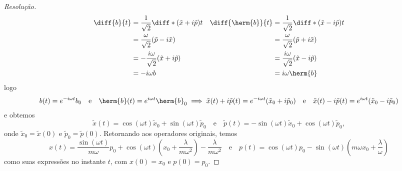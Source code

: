 \begin{proof}[Resolução]
\begin{align*}
        \diff{b}{t} &= \frac{1}{\sqrt{2}}\diff*{(\tilde{x} + i\tilde{p})}{t}&
        \diff{\herm{b}}{t} &= \frac{1}{\sqrt{2}}\diff*{(\tilde{x} - i\tilde{p})}{t}\\
                           &= \frac{\omega}{\sqrt{2}}(\tilde{p} - i \tilde{x})&
                           &= \frac{\omega}{\sqrt{2}}(\tilde{p} + i \tilde{x})\\
                           &= -\frac{i \omega}{\sqrt{2}}(\tilde{x} + i \tilde{p})&
                           &= \frac{i\omega}{\sqrt{2}}(\tilde{x} - i \tilde{p})\\
                           &= -i \omega b&
                           &= i \omega \herm{b}
    \end{align*}
    logo
    \begin{equation*}
        b(t) = e^{-i \omega t} b_0 \quad\text{e}\quad \herm{b}(t) = e^{i \omega t} \herm{b}_0 \implies \tilde{x}(t) + i \tilde{p}(t) = e^{-i \omega t} (\tilde{x}_0 + i \tilde{p}_0) \quad\text{e}\quad \tilde{x}(t) - i \tilde{p}(t) = e^{i \omega t} (\tilde{x}_0 - i \tilde{p}_0) 
    \end{equation*}
    e obtemos
    \begin{equation*}
        \tilde{x}(t) = \cos(\omega t) \tilde{x}_0 + \sin(\omega t) \tilde{p}_0
        \quad\text{e}\quad
        \tilde{p}(t) = - \sin(\omega t) \tilde{x}_0 + \cos(\omega t) \tilde{p}_0,
    \end{equation*}
    onde \(\tilde{x}_0 = \tilde{x}(0)\) e \(\tilde{p}_0 = \tilde{p}(0).\)
    Retornando aos operadores originais, temos
    \begin{equation*}
        x(t) = \frac{\sin(\omega t)}{m \omega} p_0+ \cos(\omega t) \left(x_0 + \frac{\lambda}{m \omega^2}\right) - \frac{\lambda}{m \omega^2}
        \quad\text{e}\quad
        p(t) = \cos(\omega t) p_0 - \sin(\omega t) \left( m \omega x_0 + \frac{\lambda}{\omega}\right)
    \end{equation*}
    como suas expressões no instante \(t\), com \(x(0) = x_0\) e \(p(0) = p_0\).


\end{proof}
